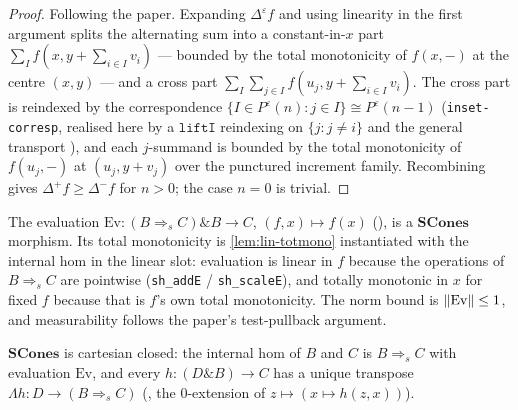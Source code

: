\begin{proof}
Following the paper. Expanding $\Delta^\varepsilon f$ and using linearity
in the first argument splits the alternating sum into a constant-in-$x$
part $\sum_{I} f(x, y + \sum_{i \in I} v_i)$ --- bounded by the total
monotonicity of $f(x, -)$ at the centre $(x,y)$ --- and a cross part
$\sum_{I} \sum_{j \in I} f(u_j, y + \sum_{i \in I} v_i)$. The cross part
is reindexed by the correspondence $\{I \in \mathit{P}^\varepsilon(n) :
j \in I\} \cong \mathit{P}^\varepsilon(n{-}1)$ (\texttt{inset-corresp},
realised here by a $\texttt{liftI}$ reindexing on $\{j : j \neq i\}$ and
the general transport
), and each $j$-summand is
bounded by the total monotonicity of $f(u_j, -)$ at $(u_j, y + v_j)$
over the punctured increment family. Recombining gives
$\Delta^+ f \geq \Delta^- f$ for $n > 0$; the case $n = 0$ is trivial.
\end{proof}

\begin{lemma}\label{lem:ev}
\rocqok{}
The evaluation $\mathrm{Ev} : (B \mathbin{\Rightarrow_s} C) \mathbin{\&}
B \to C$, $(f, x) \mapsto f(x)$
(), is a $\mathbf{SCones}$
morphism. Its total monotonicity is \autoref{lem:lin-totmono} instantiated
with the internal hom in the linear slot: evaluation is linear in $f$
because the operations of $B \mathbin{\Rightarrow_s} C$ are pointwise
(\texttt{sh\_addE} / \texttt{sh\_scaleE}), and totally monotonic in $x$
for fixed $f$ because that is $f$'s own total monotonicity. The norm bound
is $\lVert \mathrm{Ev} \rVert \leq 1$, and measurability follows the paper's
test-pullback argument.
\end{lemma}

\begin{theorem}
\label{thm:scones-ccc}
\rocqok
{}
$\mathbf{SCones}$ is cartesian closed: the internal hom of $B$ and $C$ is
$B \mathbin{\Rightarrow_s} C$ with evaluation $\mathrm{Ev}$, and every
$h : (D \mathbin{\&} B) \to C$ has a unique transpose
$\Lambda h : D \to (B \mathbin{\Rightarrow_s} C)$
(, the $0$-extension of
$z \mapsto (x \mapsto h(z,x))$).
\end{theorem}

